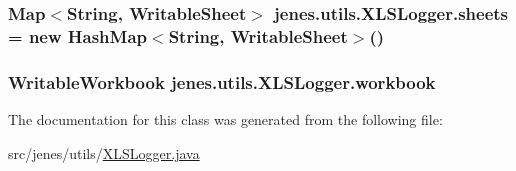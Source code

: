 \hypertarget{classjenes_1_1utils_1_1_x_l_s_logger_a06bcfe322f856670f3706369261bc7c7}{
\subsubsection[{sheets}]{\setlength{\rightskip}{0pt plus 5cm}Map$<$String, Writable\-Sheet$>$ jenes.\-utils.\-X\-L\-S\-Logger.\-sheets = new Hash\-Map$<$String, Writable\-Sheet$>$()\hspace{0.3cm}{\ttfamily [private]}}}\label{classjenes_1_1utils_1_1_x_l_s_logger_a06bcfe322f856670f3706369261bc7c7}
\hypertarget{classjenes_1_1utils_1_1_x_l_s_logger_ad776c22f388365c6f1a8c21e786f9928}{
\subsubsection[{workbook}]{\setlength{\rightskip}{0pt plus 5cm}Writable\-Workbook jenes.\-utils.\-X\-L\-S\-Logger.\-workbook\hspace{0.3cm}{\ttfamily [private]}}}\label{classjenes_1_1utils_1_1_x_l_s_logger_ad776c22f388365c6f1a8c21e786f9928}


The documentation for this class was generated from the following file\-:\begin{DoxyCompactItemize}
\item 
src/jenes/utils/\hyperlink{_x_l_s_logger_8java}{X\-L\-S\-Logger.\-java}\end{DoxyCompactItemize}
